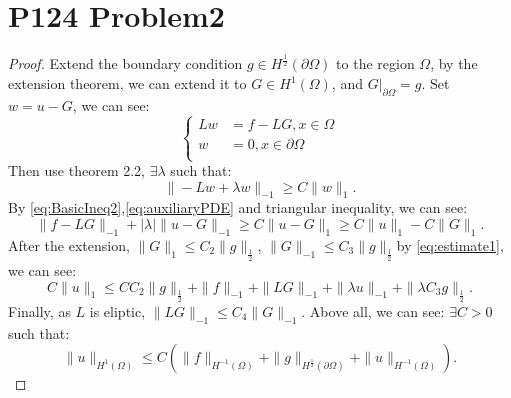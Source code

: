 \documentclass[a4paper]{ctexart}
\begin{document}
\section*{P124 Problem2}
\begin{proof}
    Extend the boundary condition $g\in H^{\frac{1}{2}}(\partial\Omega)$ to the region $\Omega$, by the extension theorem, we can extend it to $G\in H^{1}(\Omega)$, and $G|_{\partial\Omega}=g$. Set $w=u-G$, we can see:
    \begin{equation}
        \label{eq:auxiliaryPDE}
        \left\{
            \begin{aligned}
                Lw&=f-LG,x\in\Omega\\
                w&=0,x\in\partial\Omega\\
            \end{aligned}
        \right.
    \end{equation}
    Then use theorem 2.2, $\exists\lambda$ such that:
    \begin{equation}
        \label{eq:BasicIneq2}
        \|-Lw+\lambda w\|_{-1}\ge C\|w\|_{1}.
    \end{equation}
    By \eqref{eq:BasicIneq2},\eqref{eq:auxiliaryPDE} and triangular inequality, we can see:
    \begin{equation}
        \label{eq:estimate1}
        \|f-LG\|_{-1}+|\lambda|\|u-G\|_{-1}\ge C\|u-G\|_{1}\ge C\|u\|_{1}-C\|G\|_{1}.
    \end{equation}
    After the extension, $\|G\|_{1}\le C_{2}\|g\|_{\frac{1}{2}}$, $\|G\|_{-1}\le C_{3}\|g\|_{\frac{1}{2}}$by \eqref{eq:estimate1}, we can see:
    \begin{equation}
        C\|u\|_{1}\le CC_{2}\|g\|_{\frac{1}{2}}+\|f\|_{-1}+\|LG\|_{-1}+\|\lambda u\|_{-1}+\|\lambda C_{3}g\|_{\frac{1}{2}}.
    \end{equation}
    Finally, as $L$ is eliptic, $\|LG\|_{-1}\le C_{4}\|G\|_{-1}$. Above all, we can see: $\exists C>0$ such that:
    \begin{equation}
        \|u\|_{H^{1}(\Omega)}\le C(\|f\|_{H^{-1}(\Omega)}+\|g\|_{H^{\frac{1}{2}}(\partial\Omega)}+\|u\|_{H^{-1}(\Omega)}).
    \end{equation}
\end{proof}
\end{document}
